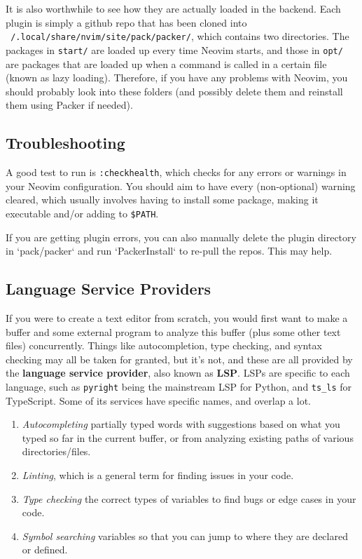   It is also worthwhile to see how they are actually loaded in the backend. Each plugin is simply a github repo that has been cloned into \texttt{~/.local/share/nvim/site/pack/packer/}, which contains two directories. The packages in \texttt{start/} are loaded up every time Neovim starts, and those in \texttt{opt/} are packages that are loaded up when a command is called in a certain file (known as lazy loading). Therefore, if you have any problems with Neovim, you should probably look into these folders (and possibly delete them and reinstall them using Packer if needed).

\subsection{Troubleshooting}

  A good test to run is \texttt{:checkhealth}, which checks for any errors or warnings in your Neovim configuration. You should aim to have every (non-optional) warning cleared, which usually involves having to install some package, making it executable and/or adding to \texttt{\$PATH}. 

  If you are getting plugin errors, you can also manually delete the plugin directory in `pack/packer` and run `PackerInstall` to re-pull the repos. This may help. 

\subsection{Language Service Providers} 

  If you were to create a text editor from scratch, you would first want to make a buffer and some external program to analyze this buffer (plus some other text files) concurrently. Things like autocompletion, type checking, and syntax checking may all be taken for granted, but it's not, and these are all provided by the \textbf{language service provider}, also known as \textbf{LSP}. LSPs are specific to each language, such as \texttt{pyright} being the mainstream LSP for Python, and \texttt{ts\_ls} for TypeScript. Some of its services have specific names, and overlap a lot. 
  \begin{enumerate}
    \item \textit{Autocompleting} partially typed words with suggestions based on what you typed so far in the current buffer, or from analyzing existing paths of various directories/files. 
    \item \textit{Linting}, which is a general term for finding issues in your code. 
    \item \textit{Type checking} the correct types of variables to find bugs or edge cases in your code. 
    \item \textit{Symbol searching} variables so that you can jump to where they are declared or defined. 
  \end{enumerate}

